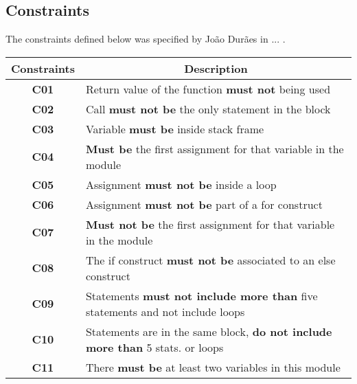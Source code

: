 \clearpage
\subsection{Constraints}

The constraints defined below was specified by João Durães in ... .

\begin{table}[!ht]
\centering
\begin{tabular}{|c|p{12cm}|}
\hline
\textbf{Constraints}            & \multicolumn{1}{c|}{\textbf{Description}}                                     \\ \hline \hline
\textbf{C01}       \label{C01}  & Return value of the function \textbf{must not} being used                              \\ \hline
\textbf{C02}       \label{C02}  & Call \textbf{must not be} the only statement in the block                              \\ \hline
\textbf{C03}       \label{C03}  & Variable \textbf{must be} inside stack frame                                           \\ \hline
\textbf{C04}       \label{C04}  & \textbf{Must be} the first assignment for that variable in the module                  \\ \hline
\textbf{C05}       \label{C05}  & Assignment \textbf{must not be} inside a loop                                          \\ \hline
\textbf{C06}       \label{C06}  & Assignment \textbf{must not be} part of a for construct                                \\ \hline
\textbf{C07}       \label{C07}  & \textbf{Must not be} the first assignment for that variable in the module              \\ \hline
\textbf{C08}       \label{C08}  & The if construct \textbf{must not be} associated to an else construct                  \\ \hline
\textbf{C09}       \label{C09}  & Statements \textbf{must not include more than} five statements and not include loops   \\ \hline
\textbf{C10}       \label{C010} & Statements are in the same block, \textbf{do not include more than} 5 stats. or loops \\ \hline
\textbf{C11}       \label{C011} & There \textbf{must be} at least two variables in this module                           \\ \hline
\end{tabular}
\end{table}

